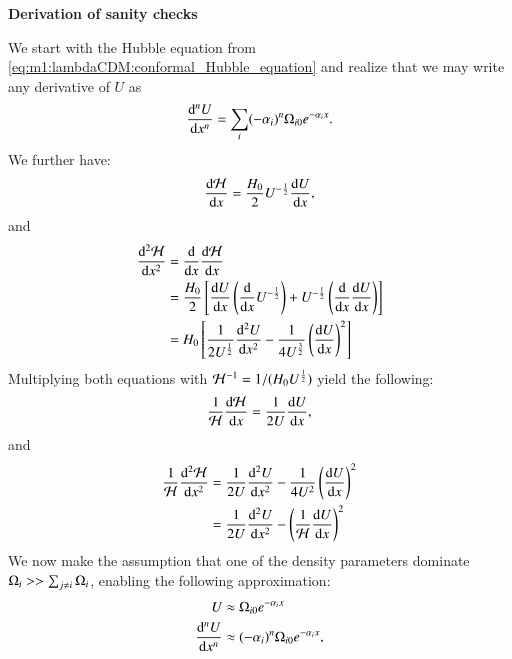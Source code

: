     \begin{tcolorbox}[
        width=1.025\linewidth,
        colback=blue!5!white,
        colframe=white
    ]
    \textbf{Derivation of sanity checks}

    We start with the Hubble equation from \cref{eq:m1:lambdaCDM:conformal_Hubble_equation} and realize that we may write any derivative of $U$ as
    \begin{equation*}
        \dv[n]{U}{x} = \sum_i(-\alpha_i)^n\Omega_{i0}e^{-\alpha_ix}.
    \end{equation*}
    We further have:
    \begin{equation*}
        \dv{\mathcal{H}}{x} = \frac{H_0}{2}U^{-\frac{1}{2}}\dv{U}{x},
    \end{equation*}
    and
    \begin{equation*}
        \begin{split}
            \dv[2]{\mathcal{H}}{x} &= \dv{}{x}\dv{\mathcal{H}}{x}\\
            &= \frac{H_0}{2}\left[\dv{U}{x}\left(\dv{}{x}U^{-\frac{1}{2}}\right) + U^{-\frac{1}{2}}\left(\dv{}{x}\dv{U}{x}\right)\right]\\
            &=H_0\left[\frac{1}{2U^{\frac{1}{2}}}\dv[2]{U}{x} - \frac{1}{4U^{\frac{3}{2}}}\left(\dv{U}{x}\right)^2\right]
        \end{split}
    \end{equation*}
    Multiplying both equations with $\mathcal{H}^{-1} = 1/(H_0U^{\frac{1}{2}})$ yield the following:
    \begin{equation*}
        \frac{1}{\mathcal{H}}\dv{\mathcal{H}}{x} = \frac{1}{2U}\dv{U}{x},
    \end{equation*}
    and 
    \begin{equation*}
        \begin{split}
            \frac{1}{\mathcal{H}}\dv[2]{\mathcal{H}}{x} &= \frac{1}{2U}\dv[2]{U}{x} - \frac{1}{4U^2}\left(\dv{U}{x}\right)^2 \\
            &= \frac{1}{2U}\dv[2]{U}{x}-\left(\frac{1}{\mathcal{H}}\dv{U}{x}\right)^2
        \end{split}
    \end{equation*}
    We now make the assumption that one of the density parameters dominate $\Omega_i>> \sum_{j\neq i}\Omega_i$, enabling the following approximation:
    \begin{equation*}
        \begin{split}
            U &\approx \O_{i0}\expe{-\alpha_ix} \\
            \dv[n]{U}{x} &\approx (-\alpha_i)^n\O_{i0}\expe{-\alpha_ix},

\end{split}
\end{equation*}
\end{tcolorbox}
